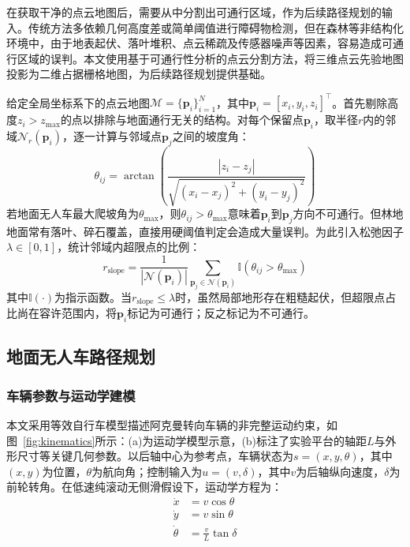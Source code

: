 \documentclass{iopjournal}
\begin{document}
在获取干净的点云地图后，需要从中分割出可通行区域，作为后续路径规划的输入。传统方法多依赖几何高度差或简单阈值进行障碍物检测，但在森林等非结构化环境中，由于地表起伏、落叶堆积、点云稀疏及传感器噪声等因素，容易造成可通行区域的误判。本文使用基于可通行性分析的点云分割方法，将三维点云先验地图投影为二维占据栅格地图，为后续路径规划提供基础\cite{feng2025constraint}。


给定全局坐标系下的点云地图$\mathcal{M} = \{\mathbf{p}_i\}_{i=1}^{N}$，其中$\mathbf{p}_i = [x_i, y_i, z_i]^\top$。首先剔除高度$z_i > z_{\max}$的点以排除与地面通行无关的结构。对每个保留点$\mathbf{p}_i$，取半径$r$内的邻域$\mathcal{N}_r(\mathbf{p}_i)$，逐一计算与邻域点$\mathbf{p}_j$之间的坡度角：
\begin{equation}
  \theta_{ij} = \arctan\!\left(\frac{|z_i - z_j|}{\sqrt{(x_i-x_j)^2+(y_i-y_j)^2}}\right)
\end{equation}
若地面无人车最大爬坡角为$\theta_{\max}$，则$\theta_{ij} > \theta_{\max}$意味着$\mathbf{p}_i$到$\mathbf{p}_j$方向不可通行。但林地地面常有落叶、碎石覆盖，直接用硬阈值判定会造成大量误判。为此引入松弛因子$\lambda \in [0,1]$，统计邻域内超限点的比例：
\begin{equation}
  r_{\text{slope}} = \frac{1}{|\mathcal{N}(\mathbf{p}_i)|}\sum_{\mathbf{p}_j \in \mathcal{N}(\mathbf{p}_i)} \mathbb{I}(\theta_{ij} > \theta_{\max})
\end{equation}
其中$\mathbb{I}(\cdot)$为指示函数。当$r_{\text{slope}} \leq \lambda$时，虽然局部地形存在粗糙起伏，但超限点占比尚在容许范围内，将$\mathbf{p}_i$标记为可通行；反之标记为不可通行。

\subsection{地面无人车路径规划}

\subsubsection{车辆参数与运动学建模}


本文采用等效自行车模型描述阿克曼转向车辆的非完整运动约束，如图~\ref{fig:kinematics}所示：(a)为运动学模型示意，(b)标注了实验平台的轴距$L$与外形尺寸等关键几何参数。以后轴中心为参考点，车辆状态为$s=(x,y,\theta)$，其中$(x,y)$为位置，$\theta$为航向角；控制输入为$u=(v,\delta)$，其中$v$为后轴纵向速度，$\delta$为前轮转角。在低速纯滚动无侧滑假设下，运动学方程为：
\begin{equation}
  \begin{aligned}
    \dot{x} &= v\cos\theta \\
    \dot{y} &= v\sin\theta \\
    \dot{\theta} &= \frac{v}{L}\tan\delta
  \end{aligned}
\end{equation}
\end{document}
